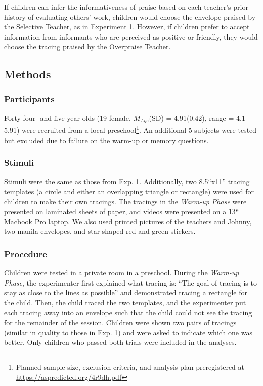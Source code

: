 \documentclass[10pt, letterpaper]{article}
\begin{document}
If children can infer the informativeness of praise based on each
teacher's prior history of evaluating others' work, children would
choose the envelope praised by the Selective Teacher, as in Experiment
1. However, if children prefer to accept information from informants who
are perceived as positive or friendly, they would choose the tracing
praised by the Overpraise Teacher.

\subsection{Methods}\label{methods-1}

\subsubsection{Participants}\label{participants-1}

Forty four- and five-year-olds (19 female, \(M_{Age}\)(SD) = 4.91(0.42),
range = 4.1 - 5.91) were recruited from a local preschool\footnote{Planned
  sample size, exclusion criteria, and analysis plan preregistered at
  \url{https://aspredicted.org/4r9dh.pdf}}. An additional 5 subjects
were tested but excluded due to failure on the warm-up or memory
questions.

\subsubsection{Stimuli}\label{stimuli-1}

Stimuli were the same as those from Exp. 1. Additionally, two 8.5``x11''
tracing templates (a circle and either an overlapping triangle or
rectangle) were used for children to make their own tracings. The
tracings in the \textit{Warm-up Phase} were presented on laminated
sheets of paper, and videos were presented on a 13`` Macbook Pro laptop.
We also used printed pictures of the teachers and Johnny, two manila
envelopes, and star-shaped red and green stickers.

\subsubsection{Procedure}\label{procedure-1}

Children were tested in a private room in a preschool. During the
\textit{Warm-up Phase}, the experimenter first explained what tracing
is: ``The goal of tracing is to stay as close to the lines as possible''
and demonstrated tracing a rectangle for the child. Then, the child
traced the two templates, and the experimenter put each tracing away
into an envelope such that the child could not see the tracing for the
remainder of the session. Children were shown two pairs of tracings
(similar in quality to those in Exp. 1) and were asked to indicate which
one was better. Only children who passed both trials were included in
the analyses.
\end{document}
